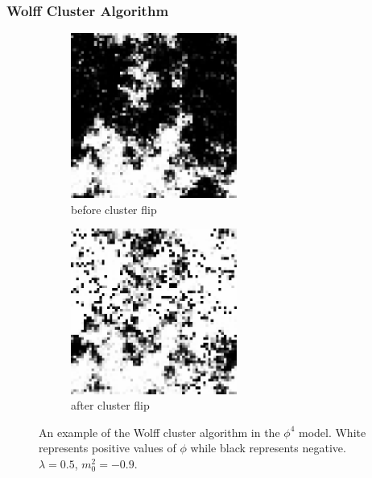 \documentclass{beamer}
\begin{document}
\begin{frame}
    \frametitle{Wolff Cluster Algorithm}

    \begin{figure}[h]
      \centering
          \begin{subfigure}[b]{0.5\textwidth}\centering
            \includegraphics[width=0.6\textwidth]{imgs/wolffa.png}
            \caption{before cluster flip}
          \end{subfigure}%
          \hfill
          \begin{subfigure}[b]{0.5\textwidth}\centering
            \includegraphics[width=0.6\textwidth]{imgs/wolffb.png}
            \caption{after cluster flip}
          \end{subfigure}
          \hfill
          \caption{\label{fig:wolff} An example of the Wolff cluster algorithm in the $\phi^4$ model. White represents positive values of $\phi$ while black represents negative. $\lambda=0.5$, $m_0^2=-0.9$.}
  
    \end{figure}
\end{frame}
\end{document}
